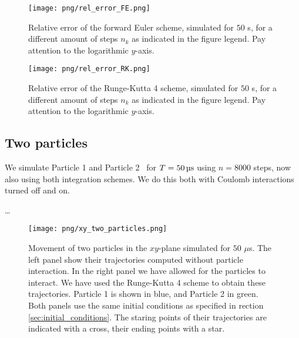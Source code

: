 \begin{figure}
    \texttt{[image: png/rel\_error\_FE.png]}
    \caption{Relative error of the forward Euler scheme, simulated for $50$ \textmu s, for a different amount of steps $n_k$ as indicated in the figure legend. Pay attention to the logarithmic $y$-axis.}
    \label{fig:error_FE}
\end{figure}


\begin{figure}
    \texttt{[image: png/rel\_error\_RK.png]}
    \caption{Relative error of the Runge-Kutta 4 scheme, simulated for $50$ \textmu s, for a different amount of steps $n_k$ as indicated in the figure legend. Pay attention to the logarithmic $y$-axis.}
    \label{fig:error_RK}
\end{figure}







\subsection{Two particles}\label{sec:two_particles}

We simulate Particle 1 and Particle 2  for $T = 50 \,\mathrm{\text{\textmu} s}$ using $n=8000$ steps, now also using both integration schemes. We do this both with Coulomb interactions turned off and on. 


\dots






\newpage
\onecolumngrid


\begin{figure}
    \texttt{[image: png/xy\_two\_particles.png]}
    \caption{Movement of two particles in the $xy$-plane simulated for $50$ $\mu$s. The left panel show their trajectories computed without particle interaction. In the right panel we have allowed for the particles to interact. We have used the Runge-Kutta 4 scheme to obtain these trajectories. Particle 1 is shown in blue, and Particle 2 in green. Both panels use the same initial conditions as specified in rection \ref{sec:initial_conditions}. The staring points of their trajectories are indicated with a cross, their ending points with a star. }
    \label{fig:xy_two_particles}
\end{figure}

